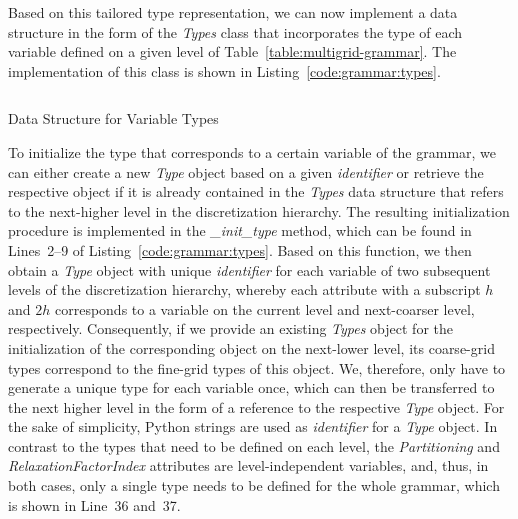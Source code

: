 Based on this tailored type representation, we can now implement a data structure in the form of the \emph{Types} class that incorporates the type of each variable defined on a given level of Table~\ref{table:multigrid-grammar}.
The implementation of this class is shown in Listing~\ref{code:grammar:types}.
\begin{listing}
  	\inputminted[linenos]{python}{evostencils/grammar/types.py}
  	\caption{Data Structure for Variable Types}
  	\label{code:grammar:types}
\end{listing}
To initialize the type that corresponds to a certain variable of the grammar, we can either create a new \emph{Type} object based on a given \emph{identifier} or retrieve the respective object if it is already contained in the \emph{Types} data structure that refers to the next-higher level in the discretization hierarchy.
The resulting initialization procedure is implemented in the \emph{\_init\_type} method, which can be found in Lines~2--9 of Listing~\ref{code:grammar:types}.
Based on this function, we then obtain a \emph{Type} object with unique \emph{identifier} for each variable of two subsequent levels of the discretization hierarchy, whereby each attribute with a subscript $h$ and $2h$ corresponds to a variable on the current level and next-coarser level, respectively.
Consequently, if we provide an existing \emph{Types} object for the initialization of the corresponding object on the next-lower level, its coarse-grid types correspond to the fine-grid types of this object.
We, therefore, only have to generate a unique type for each variable once, which can then be transferred to the next higher level in the form of a reference to the respective \emph{Type} object.
For the sake of simplicity, Python strings are used as \emph{identifier} for a \emph{Type} object. 
In contrast to the types that need to be defined on each level, the \emph{Partitioning} and \emph{RelaxationFactorIndex} attributes are level-independent variables, and, thus, in both cases, only a single type needs to be defined for the whole grammar, which is shown in Line~36 and~37.

